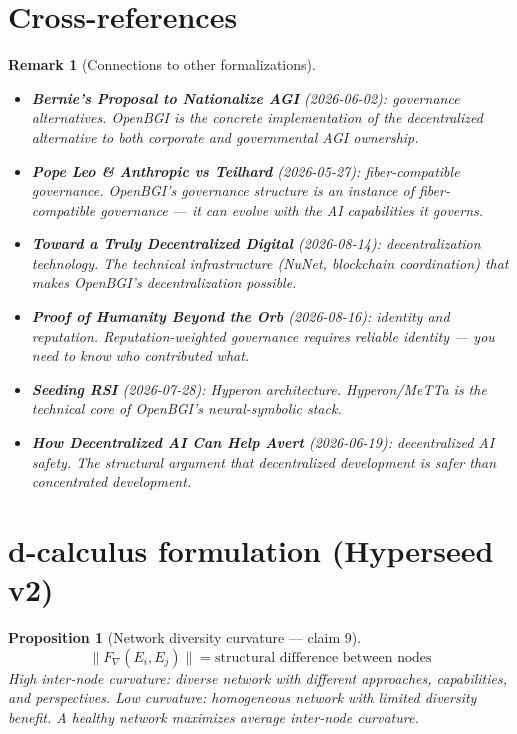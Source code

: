 \documentclass[11pt,a4paper]{article}
\newtheorem{proposition}[definition]{Proposition}
\newtheorem{remark}[definition]{Remark}
\begin{document}

\section{Cross-references}

\begin{remark}[Connections to other formalizations]
\begin{itemize}
\item \textbf{Bernie's Proposal to Nationalize AGI} (2026-06-02):
  governance alternatives. OpenBGI is the concrete implementation of
  the decentralized alternative to both corporate and governmental
  AGI ownership.
\item \textbf{Pope Leo \& Anthropic vs Teilhard} (2026-05-27):
  fiber-compatible governance. OpenBGI's governance structure is an
  instance of fiber-compatible governance --- it can evolve with the
  AI capabilities it governs.
\item \textbf{Toward a Truly Decentralized Digital} (2026-08-14):
  decentralization technology. The technical infrastructure (NuNet,
  blockchain coordination) that makes OpenBGI's decentralization
  possible.
\item \textbf{Proof of Humanity Beyond the Orb} (2026-08-16):
  identity and reputation. Reputation-weighted governance requires
  reliable identity --- you need to know who contributed what.
\item \textbf{Seeding RSI} (2026-07-28): Hyperon architecture.
  Hyperon/MeTTa is the technical core of OpenBGI's neural-symbolic
  stack.
\item \textbf{How Decentralized AI Can Help Avert} (2026-06-19):
  decentralized AI safety. The structural argument that decentralized
  development is safer than concentrated development.
\end{itemize}
\end{remark}

\section{d-calculus formulation (Hyperseed v2)}

\begin{proposition}[Network diversity curvature --- claim 9]
\label{prop:diversity}
\[
  \|F_\nabla(E_i, E_j)\| = \text{structural difference between nodes}
\]
High inter-node curvature: diverse network with different approaches,
capabilities, and perspectives. Low curvature: homogeneous network with
limited diversity benefit. A healthy network maximizes average inter-node
curvature.
\end{proposition}
\end{document}
